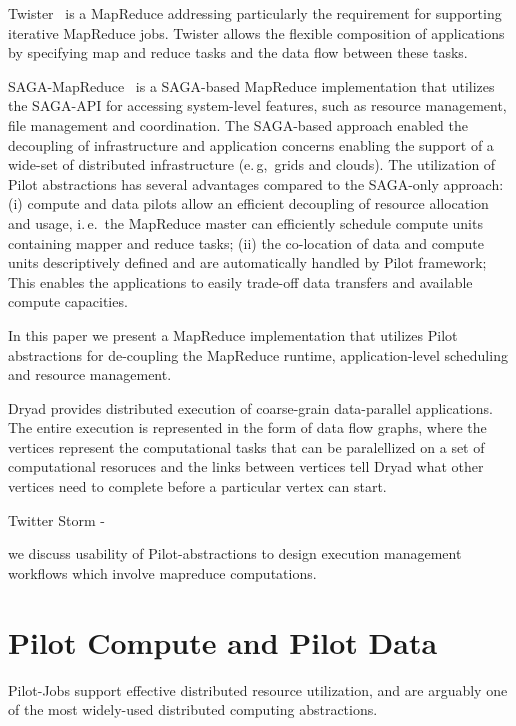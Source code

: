 \documentclass{acm_proc_article-sp}
\newcommand{\pilot}{Pilot\xspace}
\begin{document}
Twister~\cite{Ekanayake:2010:TRI:1851476.1851593} is a 
MapReduce addressing particularly the requirement for supporting iterative 
MapReduce jobs. Twister allows the flexible composition of applications by 
specifying map and reduce tasks and the data flow between these tasks. 

SAGA-MapReduce~\cite{Sehgal:2011:UAI:1945091.1945329} is a SAGA-based
MapReduce implementation that utilizes the SAGA-API for accessing system-level
features, such as resource management, file management and coordination. The
SAGA-based approach enabled the decoupling of infrastructure and application
concerns enabling the support of a wide-set of distributed infrastructure
(e.\,g,\ grids and clouds). The utilization of Pilot abstractions has several
advantages compared to the SAGA-only approach: (i) compute and data pilots
allow an efficient decoupling of resource allocation and usage, i.\,e.\ the
MapReduce master can efficiently schedule compute units containing mapper and
reduce tasks; (ii) the co-location of data and compute units descriptively
defined and are automatically handled by Pilot framework; This enables the
applications to easily trade-off data transfers and available compute
capacities.

In this paper we present a  MapReduce implementation that utilizes \pilot abstractions for de-coupling the MapReduce runtime, application-level scheduling and resource management.


Dryad provides distributed execution of coarse-grain data-parallel applications. The entire execution is represented in the form of data flow graphs, where the vertices represent the computational tasks that can be paralellized on a set of computational resoruces and the links between vertices tell Dryad what other vertices need to complete before a particular vertex can start.

Twitter Storm -

we discuss usability of \pilot-abstractions to design execution management workflows which involve mapreduce computations. 

\section{Pilot Compute and Pilot Data}

Pilot-Jobs support effective distributed resource utilization, and are arguably one of the most widely-used distributed computing abstractions. 
\end{document}
